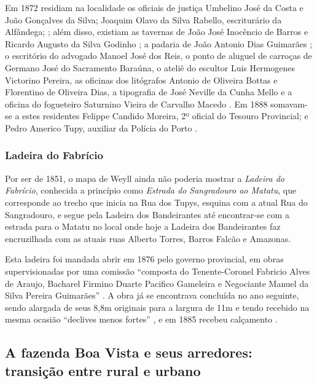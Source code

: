 Em 1872 residiam na localidade os oficiais de justiça Umbelino José da Costa e João Gonçalves da Silva; Joaquim Olavo da Silva Rabello, escriturário da Alfândega; \cite[segunda~parte, pp.~60, 128, 167]{pimenta_almanak_1872}; além disso, existiam as tavernas de João José Inocêncio de Barros e Ricardo Augusto da Silva Godinho \cite[terceira parte, pp.~43, 49]{pimenta_almanak_1872}; a padaria de João Antonio Dias Guimarães \cite[terceira parte, p.~52]{pimenta_almanak_1872}; o escritório do advogado Manoel José dos Reis, o ponto de aluguel de carroças de Germano José do Sacramento Baraúna, o ateliê do escultor Luis Hermogenes Victorino Pereira, as oficinas dos litógrafos Antonio de Oliveira Bottas e Florentino de Oliveira Dias, a tipografia de José Neville da Cunha Mello e a oficina do fogueteiro Saturnino Vieira de Carvalho Macedo \cite[quarta parte, pp.~2, 20, 35, 36, 38 43]{pimenta_almanak_1872}. Em 1888 somavam-se a estes residentes Felippe Candido Moreira, 2º oficial do Tesouro Provincial; e Pedro Americo Tupy, auxiliar da Polícia do Porto \cite[pp.~18, 30]{carvalho_almanach_1888}. 

\subsubsection{Ladeira do Fabrício}\label{subsubsec:fabricio}

Por ser de 1851, o mapa de Weyll ainda não poderia mostrar a \textit{Ladeira do Fabrício}, conhecida a princípio como \textit{Estrada do Sangradouro ao Matatu}, que corresponde ao trecho que inicia na Rua dos Tupys, esquina com a atual Rua do Sangradouro, e segue pela Ladeira dos Bandeirantes até encontrar-se com a estrada para o Matatu no local onde hoje a Ladeira dos Bandeirantes faz encruzilhada com as atuais ruas Alberto Torres, Barros Falcão e Amazonas. 

Esta ladeira foi mandada abrir em 1876 pelo governo provincial, em obras supervisionadas por uma comissão ``composta do Tenente-Coronel Fabricio Alves de Araujo, Bacharel Firmino Duarte Pacifico Gameleira e Negociante Manuel da Silva Pereira Guimarães'' \cite[p.~23]{bahia_1878}. A obra já se encontrava concluída no ano seguinte, sendo alargada de seus 8,8m originais para a largura de 11m e tendo recebido na mesma ocasião ``declives menos fortes'' \cite[p.~228]{bahia_1879}, e em 1885 recebeu calçamento \cite[p.~11]{bahia_1885}.

\subsection{A fazenda Boa Vista e seus arredores: transição entre rural e urbano}

